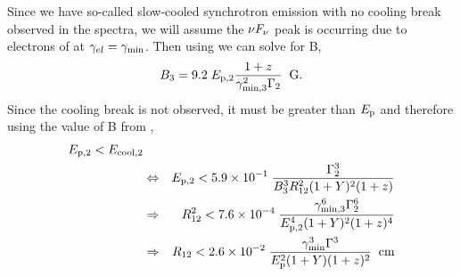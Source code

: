Since we have so-called slow-cooled synchrotron emission with no
cooling break observed in the spectra, we will assume the $\nu F_{\nu}$ peak
is occurring due to electrons of at $\gamma_{el}=\gamma_{\rm min}$. Then
using  we can solve for B,
\begin{equation}
  \label{eq:slvB}
  B_3=9.2\; E_{\rm p, 2} \frac{1+z}{\gamma_{\rm min,3}^2 \Gamma_2}\;\; {\rm G}.
\end{equation}
Since the cooling break is not observed, it must be greater than $E_{\rm p}$ and therefore using the value of B from ,
\begin{eqnarray}
  \label{eq:derv4}
 E_{\rm p,2} < E_{\rm cool,2} & & \\
 &\Leftrightarrow & E_{\rm p,2}  < 5.9 \times 10^{-1}\; \frac{\Gamma_2^3}{B_3^3 R_{12}^2 (1+Y)^2 (1+z)}\\
&\Rightarrow &  R_{12}^2 <  7.6\times 10^{-4} \; \frac{\gamma_{\rm min,3}^6 \Gamma_2^6}{E_{\rm p,2}^4 (1+Y)^2(1+z)^4}\\
&\Rightarrow & R_{12} <  2.6\times 10^{-2}\; \frac{\gamma_{\rm min}^3 \Gamma^3}{E_{\rm p}^2 (1+Y)(1+z)^2}\;\; {\rm cm}
\end{eqnarray}






